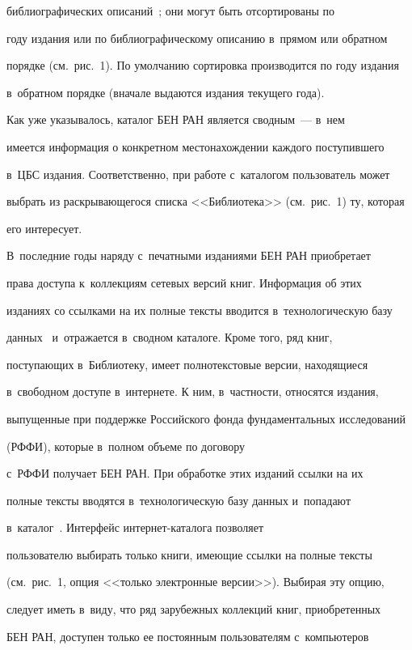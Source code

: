 библиографических описаний~\cite{6-vla}; они могут быть отсортированы по 

году издания или по библиографическому описанию в~прямом или обратном 

порядке (см.\ рис.~1). По умолчанию сортировка производится по году издания 

в~обратном порядке (вначале выдаются издания текущего года).

  

  Как уже указывалось, каталог БЕН РАН является сводным~--- в~нем 

имеется информация о конкретном местонахождении каждого поступившего 

в~ЦБС издания. Соответственно, при работе с~каталогом пользователь может 

выбрать из раскрывающегося списка <<Библиотека>> (см.\ рис.~1) ту, которая 

его интересует.

  

  В~последние годы наряду с~печатными изданиями БЕН РАН приобретает 

права доступа к~коллекциям сетевых версий книг. Информация об этих 

изданиях со ссылками на их полные тексты вводится в~технологическую базу 

данных~\cite{4-vla} и~отражается в~сводном каталоге. Кроме того, ряд книг, 

поступающих в~Библиотеку, имеет полнотекстовые версии, находящиеся 

в~свободном доступе в~интернете. К ним, в~частности, относятся издания, 

выпущенные при поддержке Российского фонда фундаментальных исследований

(РФФИ), которые в~полном объеме по договору 

с~РФФИ получает БЕН РАН. При обработке этих изданий ссылки на их 

полные тексты вводятся в~технологическую базу данных и~попадают 

в~каталог~\cite{7-vla}. Интерфейс ин\-тер\-нет-ка\-та\-ло\-га позволяет 

пользователю выбирать только книги, имеющие ссылки на полные тексты 

(см.\ рис.~1, опция <<только электронные версии>>). Выбирая эту опцию, 

следует иметь в~виду, что ряд зарубежных коллекций книг, приобретенных 

БЕН РАН, доступен только ее постоянным пользователям с~компьютеров 

